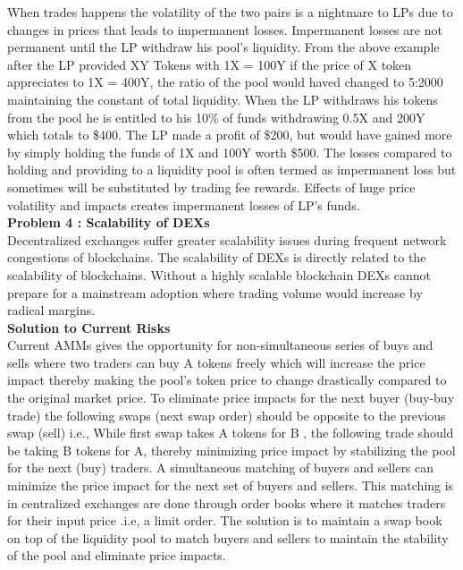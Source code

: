 \documentclass[letterpaper,11pt]{article}
\begin{document}
When trades happens the volatility of the two pairs is a nightmare to LPs due to changes in prices that leads to impermanent losses. Impermanent losses are not permanent until the LP withdraw his pool's liquidity. From the above example after the LP provided XY Tokens with 1X = 100Y if the price of X token appreciates to 1X = 400Y, the ratio of the pool would haved changed to 5:2000 maintaining the constant of total liquidity. When the LP withdraws his tokens from the pool he is entitled to his 10\% of funds withdrawing 0.5X and 200Y which totals to \$400. The LP made a profit of \$200, but would have gained more by simply holding the funds of 1X and 100Y worth \$500. The losses compared to holding and providing to a liquidity pool is often termed as impermanent loss but sometimes will be substituted by trading fee rewards. Effects of huge price volatility and impacts creates impermanent losses of LP's funds.\\

\textbf{Problem 4 : Scalability of DEXs}\\

Decentralized exchanges suffer greater scalability issues during frequent network congestions of blockchains. The scalability of DEXs is directly related to the scalability of blockchains. Without a highly scalable blockchain DEXs cannot prepare for a mainstream adoption where trading volume would increase by radical margins.\\

\textbf{Solution to Current Risks}\\

Current AMMs gives the opportunity for non-simultaneous series of buys and sells where two traders can buy A tokens freely which will increase the price impact thereby making the pool's token price to change drastically compared to the original market price. To eliminate price impacts for the next buyer (buy-buy trade) the following swaps (next swap order) should be opposite to the previous swap (sell) i.e., While first swap takes A tokens for B , the following trade should be taking B tokens for A, thereby minimizing price impact by stabilizing the pool for the next (buy) traders. A simultaneous matching of buyers and sellers can minimize the price impact for the next set of buyers and sellers. This matching is in centralized exchanges are done through order books where it matches traders for their input price .i.e, a limit order. The solution is to maintain a swap book on top of the liquidity pool to match buyers and sellers to maintain the stability of the pool and eliminate price impacts.\\
\end{document}
